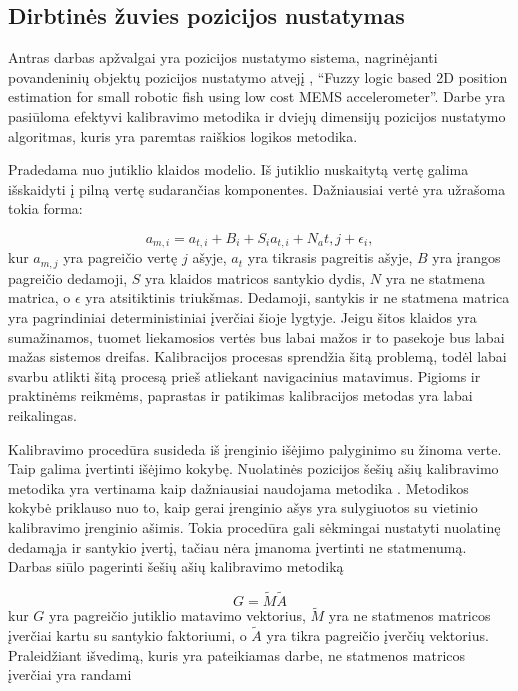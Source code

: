 \subsection{Dirbtinės žuvies pozicijos nustatymas}

Antras darbas apžvalgai yra pozicijos nustatymo sistema, nagrinėjanti povandeninių objektų pozicijos nustatymo atvejį \cite{yoo2011fuzzy}, ``Fuzzy logic based 2D position estimation for small robotic fish using low cost MEMS accelerometer''. Darbe yra pasiūloma efektyvi kalibravimo metodika ir dviejų dimensijų pozicijos nustatymo algoritmas, kuris yra paremtas raiškios logikos metodika.

Pradedama nuo jutiklio klaidos modelio. Iš jutiklio nuskaitytą vertę galima išskaidyti į pilną vertę sudarančias komponentes. Dažniausiai vertė yra užrašoma tokia forma:

\begin{equation}
    a_{m,i} = a_{t,i} + B_i + S_{i}a_{t,i} + N_a{t,j} + \epsilon_i,
\end{equation}
kur $a_{m,j}$ yra pagreičio vertę $j$ ašyje, $a_t$ yra tikrasis pagreitis ašyje, $B$ yra įrangos pagreičio dedamoji, $S$ yra klaidos matricos santykio dydis, $N$ yra ne statmena matrica, o $\epsilon$ yra atsitiktinis triukšmas. Dedamoji, santykis ir ne statmena matrica yra pagrindiniai deterministiniai įverčiai šioje lygtyje. Jeigu šitos klaidos yra sumažinamos, tuomet liekamosios vertės bus labai mažos ir to pasekoje bus labai mažas sistemos dreifas. Kalibracijos procesas sprendžia šitą problemą, todėl labai svarbu atlikti šitą procesą prieš atliekant navigacinius matavimus. Pigioms ir praktinėms reikmėms, paprastas ir patikimas kalibracijos metodas yra labai reikalingas.

Kalibravimo procedūra susideda iš įrenginio išėjimo palyginimo su žinoma verte. Taip galima įvertinti išėjimo kokybę. Nuolatinės pozicijos šešių ašių kalibravimo metodika yra vertinama kaip dažniausiai naudojama metodika \cite{syed2007new}. Metodikos kokybė priklauso nuo to, kaip gerai įrenginio ašys yra sulygiuotos su vietinio kalibravimo įrenginio ašimis. Tokia procedūra gali sėkmingai nustatyti nuolatinę dedamąja ir santykio įvertį, tačiau nėra įmanoma įvertinti ne statmenumą. Darbas siūlo pagerinti šešių ašių kalibravimo metodiką

\begin{equation}
    G = \tilde{M} \tilde{A}
\end{equation}
kur $G$ yra pagreičio jutiklio matavimo vektorius, $\tilde{M}$ yra ne statmenos matricos įverčiai kartu su santykio faktoriumi, o $\tilde{A}$ yra tikra pagreičio įverčių vektorius. Praleidžiant išvedimą, kuris yra pateikiamas darbe, ne statmenos matricos įverčiai yra randami

